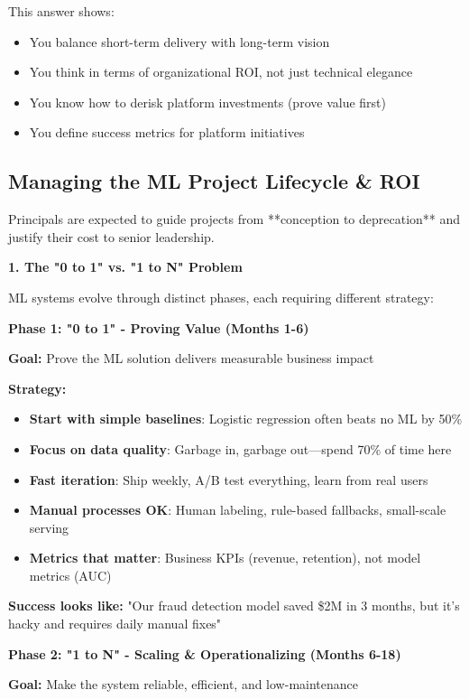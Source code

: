 \documentclass[10pt]{article}
\begin{document}
This answer shows:
\begin{itemize}
\item You balance short-term delivery with long-term vision
\item You think in terms of organizational ROI, not just technical elegance
\item You know how to derisk platform investments (prove value first)
\item You define success metrics for platform initiatives
\end{itemize}

\subsection{Managing the ML Project Lifecycle \& ROI}

Principals are expected to guide projects from **conception to deprecation** and justify their cost to senior leadership.

\textbf{1. The "0 to 1" vs. "1 to N" Problem}

ML systems evolve through distinct phases, each requiring different strategy:

\textbf{Phase 1: "0 to 1" - Proving Value (Months 1-6)}

\textbf{Goal:} Prove the ML solution delivers measurable business impact

\textbf{Strategy:}
\begin{itemize}
\item \textbf{Start with simple baselines}: Logistic regression often beats no ML by 50\%
\item \textbf{Focus on data quality}: Garbage in, garbage out—spend 70\% of time here
\item \textbf{Fast iteration}: Ship weekly, A/B test everything, learn from real users
\item \textbf{Manual processes OK}: Human labeling, rule-based fallbacks, small-scale serving
\item \textbf{Metrics that matter}: Business KPIs (revenue, retention), not model metrics (AUC)
\end{itemize}

\textbf{Success looks like:} "Our fraud detection model saved \$2M in 3 months, but it's hacky and requires daily manual fixes"

\textbf{Phase 2: "1 to N" - Scaling \& Operationalizing (Months 6-18)}

\textbf{Goal:} Make the system reliable, efficient, and low-maintenance
\end{document}
